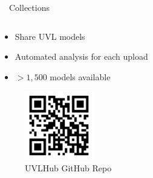 \documentclass[
	aspectratio=169, %
	8pt, %
	nosectionframes, %
]{beamer}
\newcommand{\inlinesubtitle}[1]{\textcolor{gray!60}{~{}~#1}}
\begin{document}
\begin{frame}{\insertsection \inlinesubtitle{Collections}}
\begin{columns}[t]
\begin{column}{0.3\textwidth}
            \begin{itemize}
                \item Share UVL models
                \item Automated analysis for each upload
                \item $>1,500$ models available  
            \end{itemize}
            \begin{figure}
                \centering
                \includegraphics[width=3cm]{pics/qr/uvlhub.pdf}
                \caption{UVLHub GitHub Repo}
            \end{figure}
        \end{column}
	\end{columns}
\end{frame}
\end{document}
